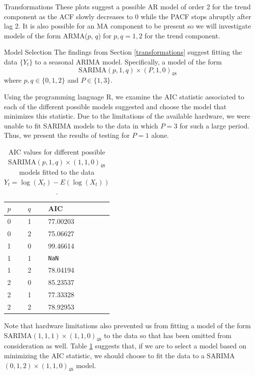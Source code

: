 \begin{subsection}{Transformations}
  These plots suggest a possible AR model of order 2 for the trend component as the ACF
  slowly decreases to
  0 while the PACF stops abruptly after lag 2. It is also possible for an MA component
  to be present so we will investigate models of the form ARMA($p$, $q$) for $p,q=1,2$
  for the trend component.
\end{subsection}

\begin{subsection}{Model Selection}
  The findings from Section \ref{transformations} suggest fitting the data $\{Y_t\}$
  to a seasonal ARIMA model. Specifically, a model of the form
  \[
    \text{SARIMA}(p, 1, q)\times (P, 1, 0)_{48}
  \]
  where $p, q \in \{0, 1, 2\}$ and $P \in \{1, 3\}$.

  Using the programming language R, we examine the AIC statistic associated to
  each of the different possible models suggested and choose the model that
  minimizes this statistic. Due to the limitations of the available hardware,
  we were unable to fit SARIMA models to the data in which $P=3$ for such a large period.
  Thus, we present the results of testing for $P=1$ alone.

  \begin{table}[h!]
    \centering
    \def\arraystretch{1.25}
    \begin{tabular}{| p{1.5cm} | p{1.5cm} | p{2cm} |}
      \hline
      $p$ & $q$ & AIC \\
      \hline
      0 & 1 & 77.00203 \\
      0 & 2 & 75.06627 \\
      1 & 0 & 99.46614 \\
      1 & 1 & \texttt{NaN} \\
      1 & 2 & 78.04194 \\
      2 & 0 & 85.23537 \\
      2 & 1 & 77.33328 \\
      2 & 2 & 78.92953 \\
      \hline
    \end{tabular}
    \vspace{3mm}
    \caption{AIC values for different possible SARIMA$(p,1,q)\times(1,1,0)_{48}$
      models fitted to the data $Y_t = \log(X_t) - E(\log(X_t))$.}\label{aic_table}
  \end{table}

  Note that hardware limitations also prevented us from fitting a model of the
  form $\text{SARIMA}(1,1,1)\times(1,1,0)_{48}$
  to the data so that has been omitted from consideration as well. Table \ref{aic_table} suggests
  that, if we are to select a model based on minimizing the AIC statistic,
  we should choose to fit the data to a SARIMA$(0,1,2)\times(1,1,0)_{48}$ model.


\end{subsection}
